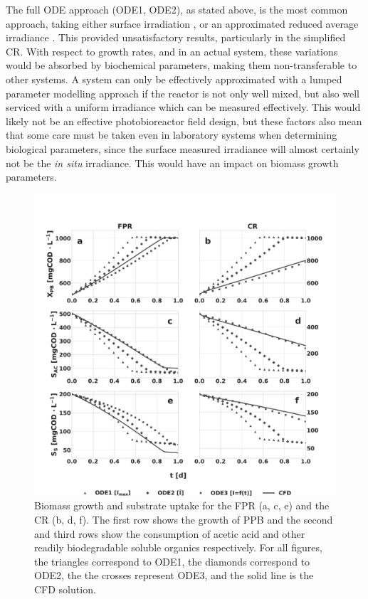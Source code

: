 The full ODE approach (ODE1, ODE2), as stated above, is the most common approach, taking either surface irradiation \cite{Uyar2007, Zhou2014}, or an approximated reduced average irradiance \cite{Lee1987, Molina-Grima1996, Bordel2009}. This provided unsatisfactory results, particularly in the simplified CR. With respect to growth rates, and in an actual system, these variations would be absorbed by biochemical parameters, making them non-transferable to other systems. A system can only be effectively approximated with a lumped parameter modelling approach if the reactor is not only well mixed, but also well serviced with a uniform irradiance which can be measured effectively. This would likely not be an effective photobioreactor field design, but these factors also mean that some care must be taken even in laboratory systems when determining biological parameters, since the surface measured irradiance will almost certainly not be the \textit{in situ} irradiance. This would have an impact on biomass growth parameters. 

\begin{figure}[tp]
\centering
\includegraphics[scale=0.38]{Images/Chap3/growth_kinetics.pdf}
\caption{Biomass growth and substrate uptake for the FPR (a, c, e) and the CR (b, d, f). The first row shows the growth of PPB and the second and third rows show the consumption of acetic acid and other readily biodegradable soluble organics respectively. For all figures, the triangles correspond to ODE1, the diamonds correspond to ODE2, the the crosses represent ODE3, and the solid line is the CFD solution.}
\label{fig:growth_evol}
\end{figure}

